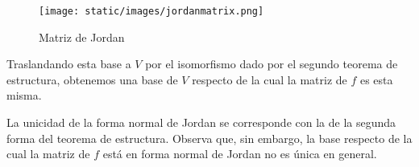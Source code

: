 \begin{figure}
\centering
\texttt{[image: static/images/jordanmatrix.png]}
\caption{Matriz de Jordan}
\end{figure}

Traslandando esta base a \(V\) por el isomorfismo dado por el segundo
teorema de estructura, obtenemos una base de \(V\) respecto de la cual
la matriz de \(f\) es esta misma.

La unicidad de la forma normal de Jordan se corresponde con la de la
segunda forma del teorema de estructura. Observa que, sin embargo, la
base respecto de la cual la matriz de \(f\) está en forma normal de
Jordan no es única en general. 
